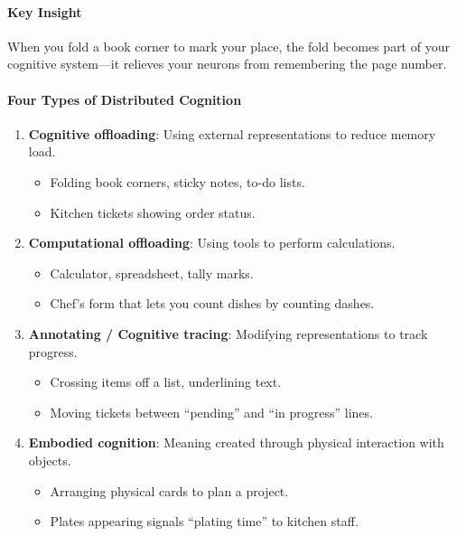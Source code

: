 \paragraph*{Key Insight}
When you fold a book corner to mark your place, the fold becomes part of your cognitive system---it relieves your neurons from remembering the page number.

\paragraph*{Four Types of Distributed Cognition}

\begin{enumerate}
  \item \textbf{Cognitive offloading}: Using external representations to reduce memory load.
  \begin{itemize}
    \item Folding book corners, sticky notes, to-do lists.
    \item Kitchen tickets showing order status.
  \end{itemize}
  
  \item \textbf{Computational offloading}: Using tools to perform calculations.
  \begin{itemize}
    \item Calculator, spreadsheet, tally marks.
    \item Chef's form that lets you count dishes by counting dashes.
  \end{itemize}
  
  \item \textbf{Annotating / Cognitive tracing}: Modifying representations to track progress.
  \begin{itemize}
    \item Crossing items off a list, underlining text.
    \item Moving tickets between ``pending'' and ``in progress'' lines.
  \end{itemize}
  
  \item \textbf{Embodied cognition}: Meaning created through physical interaction with objects.
  \begin{itemize}
    \item Arranging physical cards to plan a project.
    \item Plates appearing signals ``plating time'' to kitchen staff.
  \end{itemize}
\end{enumerate}

